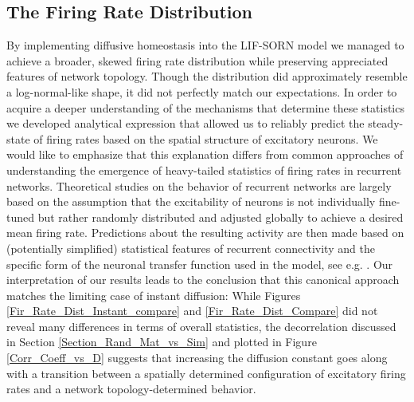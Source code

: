\documentclass[10pt,a4paper]{article}
\begin{document}
\subsection{The Firing Rate Distribution} \label{Fir_Rate_Dist_Discussion_Section}
By implementing diffusive homeostasis into the LIF-SORN model we managed to achieve a broader, skewed firing rate distribution while preserving appreciated features of network topology. Though the distribution did approximately resemble a log-normal-like shape, it did not perfectly match our expectations. In order to acquire a deeper understanding of the mechanisms that determine these statistics we developed analytical expression that allowed us to reliably predict the steady-state of firing rates based on the spatial structure of excitatory neurons. We would like to emphasize that this explanation differs from common approaches of understanding the emergence of heavy-tailed statistics of firing rates in recurrent networks. Theoretical studies on the behavior of recurrent networks are largely based on the assumption that the excitability of neurons is not individually fine-tuned but rather randomly distributed and adjusted globally to achieve a desired mean firing rate. Predictions about the resulting activity are then made based on (potentially simplified) statistical features of recurrent connectivity and the specific form of the neuronal transfer function used in the model, see e.g. \cite{Roxin_Firing_Rate_Distribution,Vreeswijk1998}. Our interpretation of our results leads to the conclusion that this canonical approach matches the limiting case of instant diffusion: While Figures \ref{Fir_Rate_Dist_Instant_compare} and \ref{Fir_Rate_Dist_Compare} did not reveal many differences in terms of overall statistics, the decorrelation discussed in Section \ref{Section_Rand_Mat_vs_Sim} and plotted in Figure \ref{Corr_Coeff_vs_D} suggests that increasing the diffusion constant goes along with a transition between a spatially determined configuration of excitatory firing rates and a network topology-determined behavior.
\end{document}
